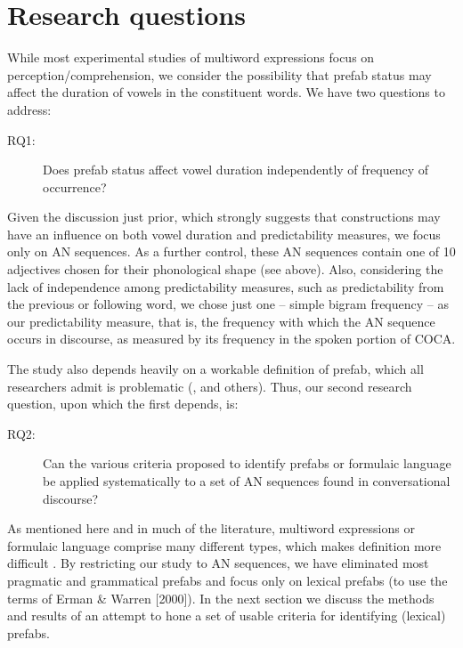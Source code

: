 \documentclass[output=paper]{langscibook}
\begin{document}
\section{Research questions}\label{sec:bybee:2}

While most experimental studies of multiword expressions focus on perception/comprehension, we consider the possibility that prefab status may affect the duration of vowels in the constituent words. We have two questions to address:  

\begin{description}
\item[RQ1:] Does prefab status affect vowel duration independently of frequency of occurrence?
\end{description}

Given the discussion just prior, which strongly suggests that constructions may have an influence on both vowel duration and predictability measures, we focus only on AN sequences. As a further control, these AN sequences contain one of 10 adjectives chosen for their phonological shape (see above). Also, considering the lack of independence among predictability measures, such as predictability from the previous or following word, we chose just one -- simple bigram frequency -- as our predictability measure, that is, the frequency with which the AN sequence occurs in discourse, as measured by its frequency in the spoken portion of COCA.

The study also depends heavily on a workable definition of prefab, which all researchers admit is problematic (\citealt{ErmanWarren2000,Wray2002}, and others). Thus, our second research question, upon which the first depends, is:

\begin{description}
\item[RQ2:] Can the various criteria proposed to identify prefabs or formulaic language be applied systematically to a set of AN sequences found in conversational discourse?
\end{description}

As mentioned here and in much of the literature, multiword expressions or formulaic language comprise many different types, which makes definition more difficult \citep{Wray2002}. By restricting our study to AN sequences, we have eliminated most pragmatic and grammatical prefabs and focus only on lexical prefabs (to use the terms of Erman \& Warren [2000]). In the next section we discuss the methods and results of an attempt to hone a set of usable criteria for identifying (lexical) prefabs. 
\end{document}
